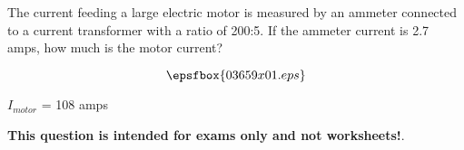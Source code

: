 

The current feeding a large electric motor is measured by an ammeter connected to a current transformer with a ratio of 200:5.  If the ammeter current is 2.7 amps, how much is the motor current?

$$\epsfbox{03659x01.eps}$$







$I_{motor}$ = 108 amps







{\bf This question is intended for exams only and not worksheets!}.



